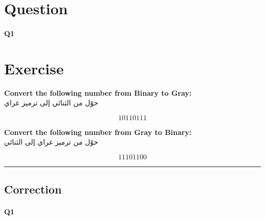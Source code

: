 
\section{Question}


\paragraph{Q1}







\section*{Exercise}

\textbf{Convert the following number from Binary to Gray:}\\
حوّل من الثنائي إلى ترميز غراي

\[
  10110111
\]

\bigskip

\textbf{Convert the following number from Gray to Binary:}\\
حوّل من ترميز غراي إلى الثنائي

\[
  11101100
\]




\hrule width 1\linewidth
\pagebreak

\subsection{Correction}


\paragraph{Q1}




